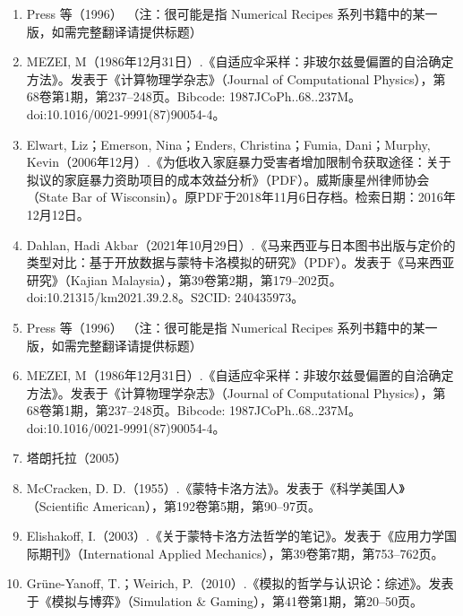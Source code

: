 \begin{enumerate}
\item Press 等（1996）
（注：很可能是指 Numerical Recipes 系列书籍中的某一版，如需完整翻译请提供标题）
\item MEZEI, M（1986年12月31日）.《自适应伞采样：非玻尔兹曼偏置的自洽确定方法》。发表于《计算物理学杂志》（Journal of Computational Physics），第68卷第1期，第237–248页。Bibcode: 1987JCoPh..68..237M。doi:10.1016/0021-9991(87)90054-4。
\item Elwart, Liz；Emerson, Nina；Enders, Christina；Fumia, Dani；Murphy, Kevin（2006年12月）.《为低收入家庭暴力受害者增加限制令获取途径：关于拟议的家庭暴力资助项目的成本效益分析》（PDF）。威斯康星州律师协会（State Bar of Wisconsin）。原PDF于2018年11月6日存档。检索日期：2016年12月12日。
\item Dahlan, Hadi Akbar（2021年10月29日）.《马来西亚与日本图书出版与定价的类型对比：基于开放数据与蒙特卡洛模拟的研究》（PDF）。发表于《马来西亚研究》（Kajian Malaysia），第39卷第2期，第179–202页。doi:10.21315/km2021.39.2.8。S2CID: 240435973。
\item Press 等（1996）
（注：很可能是指 Numerical Recipes 系列书籍中的某一版，如需完整翻译请提供标题）
\item MEZEI, M（1986年12月31日）.《自适应伞采样：非玻尔兹曼偏置的自洽确定方法》。发表于《计算物理学杂志》（Journal of Computational Physics），第68卷第1期，第237–248页。Bibcode: 1987JCoPh..68..237M。doi:10.1016/0021-9991(87)90054-4。
\item 塔朗托拉（2005）
\item McCracken, D. D.（1955）.《蒙特卡洛方法》。发表于《科学美国人》（Scientific American），第192卷第5期，第90–97页。
\item Elishakoff, I.（2003）.《关于蒙特卡洛方法哲学的笔记》。发表于《应用力学国际期刊》（International Applied Mechanics），第39卷第7期，第753–762页。
\item Grüne-Yanoff, T.；Weirich, P.（2010）.《模拟的哲学与认识论：综述》。发表于《模拟与博弈》（Simulation & Gaming），第41卷第1期，第20–50页。
\end{enumerate}
